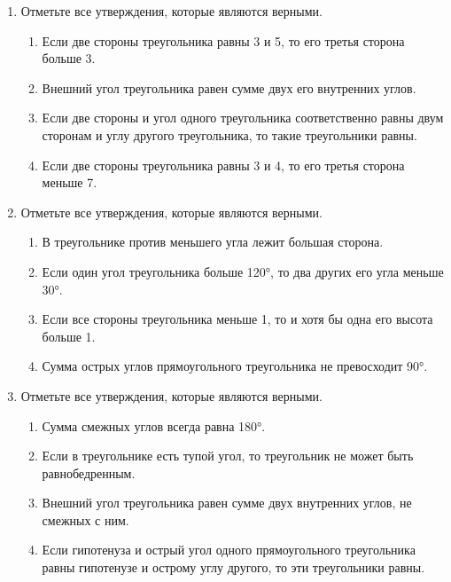 \documentclass[a4paper,12pt]{article}
\newcommand{\taskspace}{\par\vspace{0.42cm}}
\begin{document}
\begin{enumerate}[resume]
\taskspace

\item Отметьте все утверждения, которые являются верными.
\begin{enumerate}[label=\arabic*),leftmargin=8mm,itemsep=0.25em,topsep=0.35em]
\item Если две стороны треугольника равны 3 и 5, то его третья сторона больше 3.
\item Внешний угол треугольника равен сумме двух его внутренних углов.
\item Если две стороны и угол одного треугольника соответственно равны двум сторонам и углу другого треугольника, то такие треугольники равны.
\item Если две стороны треугольника равны 3 и 4, то его третья сторона меньше 7.
\end{enumerate}

\taskspace

\item Отметьте все утверждения, которые являются верными.
\begin{enumerate}[label=\arabic*),leftmargin=8mm,itemsep=0.25em,topsep=0.35em]
\item В треугольнике против меньшего угла лежит большая сторона.
\item Если один угол треугольника больше 120°, то два других его угла меньше 30°.
\item Если все стороны треугольника меньше 1, то и хотя бы одна его высота больше 1.
\item Сумма острых углов прямоугольного треугольника не превосходит 90°.
\end{enumerate}

\taskspace

\item Отметьте все утверждения, которые являются верными.
\begin{enumerate}[label=\arabic*),leftmargin=8mm,itemsep=0.25em,topsep=0.35em]
\item Сумма смежных углов всегда равна 180°.
\item Если в треугольнике есть тупой угол, то треугольник не может быть равнобедренным.
\item Внешний угол треугольника равен сумме двух внутренних углов, не смежных с ним.
\item Если гипотенуза и острый угол одного прямоугольного треугольника равны гипотенузе и острому углу другого, то эти треугольники равны.
\end{enumerate}


\end{enumerate}
\end{document}
